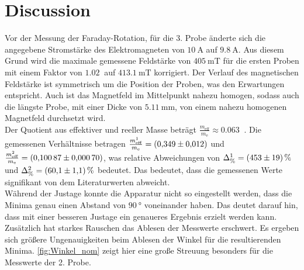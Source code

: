\section{Discussion}
\label{sec:Diskussion}


Vor der Messung der Faraday-Rotation, für die 3. Probe änderte sich die angegebene Stromstärke des Elektromagneten von $\SI{10}{\ampere}$ auf $\SI{9.8}{\ampere}$.
Aus diesem Grund wird die maximale gemessene Feldstärke von $\SI{405}{\milli\tesla}$ für die ersten Proben mit einem Faktor von $\SI{1.02}{}$ auf $\SI{413.1}{\milli\tesla}$ korrigiert.
Der Verlauf des magnetischen Feldstärke ist symmetrisch um die Position der Proben, was den Erwartungen entspricht.
Auch ist das Magnetfeld im Mittelpunkt nahezu homogen, sodass auch die längste Probe, mit einer Dicke von $\SI{5.11}{\milli\meter}$, von einem nahezu homogenen Magnetfeld durchsetzt wird.\\

Der Quotient aus effektiver und reeller Masse beträgt  $\frac{m_{\text{eff}}}{m_\text{e}} \approx \SI{0.063}{}$ \cite{GrossMarx+2018}.
Die gemessenen Verhältnisse betragen $\frac{m^1_{\text{eff}}}{m_\text{e}} = \SI{0.349 \pm 0.012}{}$ und $\frac{m^2_{\text{eff}}}{m_\text{e}} = \SI{0.10087 \pm 0.00070}{}$,
was relative Abweichungen von $\Delta^1_\text{\%} = \SI{453 \pm 19}{\%}$ und $\Delta^2_\text{\%} = \SI{60.1 \pm 1.1}{\%}$ bedeutet.
Das bedeutet, dass die gemessenen Werte signifikant von dem Literaturwerten abweicht.\\



Während der Justage konnte die Apparatur nicht so eingestellt werden, dass die Minima genau einen Abstand von $\SI{90}{\degree}$ voneinander haben.
Das deutet darauf hin, dass mit einer besseren Justage ein genaueres Ergebnis erzielt werden kann.
Zusätzlich hat starkes Rauschen das Ablesen der Messwerte erschwert.  
Es ergeben sich größere Ungenauigkeiten beim Ablesen der Winkel für die resultierenden Minima.
\autoref{fig:Winkel_nom} zeigt hier eine große Streuung besonders für die Messwerte der 2. Probe.
